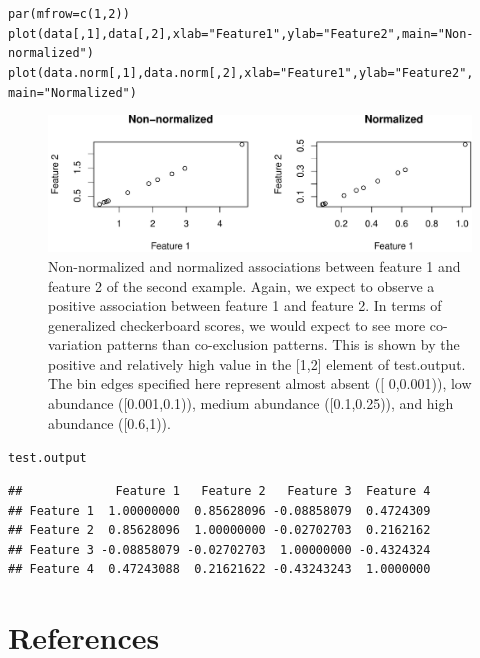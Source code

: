 \documentclass{article}\usepackage[]{graphicx}\usepackage[usenames,dvipsnames]{color}
\makeatletter
\def\maxwidth{ %
  \ifdim\Gin@nat@width>\linewidth
    \linewidth
  \else
    \Gin@nat@width
  \fi
}
\newcommand{\hlnum}[1]{\textcolor[rgb]{0.816,0.125,0.439}{#1}}%
\newcommand{\hlstr}[1]{\textcolor[rgb]{0.251,0.627,0.251}{#1}}%
\newcommand{\hlstd}[1]{\textcolor[rgb]{0.251,0.251,0.251}{#1}}%
\newcommand{\hlkwc}[1]{\textcolor[rgb]{0.251,0.251,0.251}{#1}}%
\newcommand{\hlkwd}[1]{\textcolor[rgb]{0.878,0.439,0.125}{#1}}%
\newenvironment{knitrout}{}{} %
\makeatother
\begin{document}
\begin{knitrout}
\color{fgcolor}\begin{kframe}
\begin{alltt}
\hlkwd{par}\hlstd{(}\hlkwc{mfrow}\hlstd{=}\hlkwd{c}\hlstd{(}\hlnum{1}\hlstd{,} \hlnum{2}\hlstd{))}
\hlkwd{plot}\hlstd{(data[,}\hlnum{1}\hlstd{],data[,}\hlnum{2}\hlstd{],}\hlkwc{xlab}\hlstd{=}\hlstr{"Feature 1"}\hlstd{,}\hlkwc{ylab}\hlstd{=}\hlstr{"Feature 2"}\hlstd{,}\hlkwc{main}\hlstd{=}\hlstr{"Non-normalized"}\hlstd{)}
\hlkwd{plot}\hlstd{(data.norm[,}\hlnum{1}\hlstd{],data.norm[,}\hlnum{2}\hlstd{],}\hlkwc{xlab}\hlstd{=}\hlstr{"Feature 1"}\hlstd{,}\hlkwc{ylab}\hlstd{=}\hlstr{"Feature 2"}\hlstd{,}
     \hlkwc{main}\hlstd{=}\hlstr{"Normalized"}\hlstd{)}
\end{alltt}
\end{kframe}\begin{figure}[H]
\includegraphics[width=\maxwidth]{figure/unnamed-chunk-18-1} \caption{Non-normalized and normalized associations between feature 1 and feature 2 of the second example.  Again, we expect to observe a positive association between feature 1 and feature 2.  In terms of generalized checkerboard scores, we would expect to see more co-variation patterns than co-exclusion patterns.  This is shown by the positive and relatively high value in the [1,2] element of test.output.  The bin edges specified here represent almost absent ([  0,0.001)), low abundance ([0.001,0.1)), medium abundance ([0.1,0.25)), and high abundance ([0.6,1)).}\label{fig:unnamed-chunk-18}
\end{figure}
\begin{kframe}\begin{alltt}
\hlstd{test.output}
\end{alltt}
\begin{verbatim}
##             Feature 1   Feature 2   Feature 3  Feature 4
## Feature 1  1.00000000  0.85628096 -0.08858079  0.4724309
## Feature 2  0.85628096  1.00000000 -0.02702703  0.2162162
## Feature 3 -0.08858079 -0.02702703  1.00000000 -0.4324324
## Feature 4  0.47243088  0.21621622 -0.43243243  1.0000000
\end{verbatim}
\end{kframe}
\end{knitrout}

\section{References} 



\end{document}
